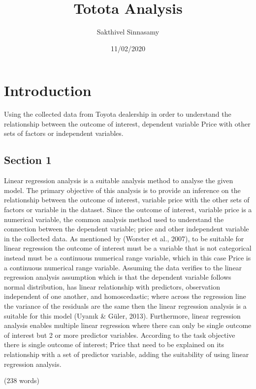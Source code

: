 \documentclass[
]{article}
\title{Totota Analysis}
\author{Sakthivel Sinnasamy}
\date{11/02/2020}
\begin{document}
\maketitle

\hypertarget{introduction}{%
\section{Introduction}\label{introduction}}

Using the collected data from Toyota dealership in order to understand
the relationship between the outcome of interest, dependent variable
Price with other sets of factors or independent variables.

\hypertarget{section-1}{%
\subsection{Section 1}\label{section-1}}

Linear regression analysis is a suitable analysis method to analyse the
given model. The primary objective of this analysis is to provide an
inference on the relationship between the outcome of interest, variable
price with the other sets of factors or variable in the dataset. Since
the outcome of interest, variable price is a numerical variable, the
common analysis method used to understand the connection between the
dependent variable; price and other independent variable in the
collected data. As mentioned by (Worster et al., 2007), to be suitable
for linear regression the outcome of interest must be a variable that is
not categorical instead must be a continuous numerical range variable,
which in this case Price is a continuous numerical range variable.
Assuming the data verifies to the linear regression analysis assumption
which is that the dependent variable follows normal distribution, has
linear relationship with predictors, observation independent of one
another, and homoscedastic; where across the regression line the
variance of the residuals are the same then the linear regression
analysis is a suitable for this model (Uyanık \& Güler, 2013).
Furthermore, linear regression analysis enables multiple linear
regression where there can only be single outcome of interest but 2 or
more predictor variables. According to the task objective there is
single outcome of interest; Price that need to be explained on its
relationship with a set of predictor variable, adding the suitability of
using linear regression analysis.

(238 words)
\end{document}
